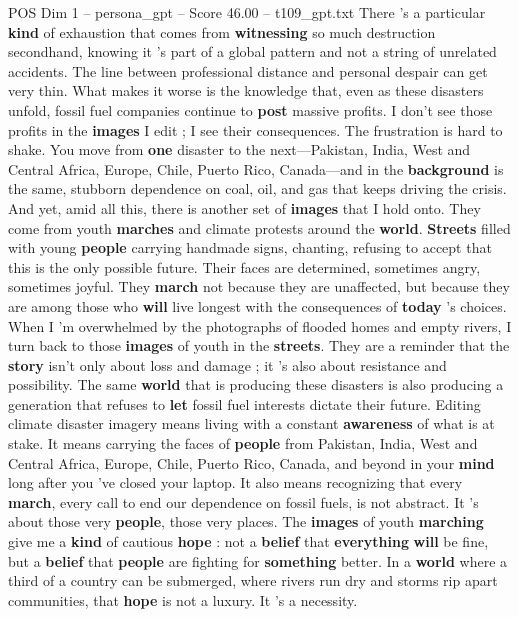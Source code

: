 \begin{textsample}{POS Dim 1 – persona\_gpt – Score 46.00 – t109\_gpt.txt}
There ’s a particular \textbf{kind} of exhaustion that comes from \textbf{witnessing} so much destruction secondhand, knowing it ’s part of a global pattern and not a string of unrelated accidents.
The line between professional distance and personal despair can get very thin.
What makes it worse is the knowledge that, even as these disasters unfold, fossil fuel companies continue to \textbf{post} massive profits.
I don't see those profits in the \textbf{images} I edit ; I see their consequences.
The frustration is hard to shake.
You move from \textbf{one} disaster to the next—Pakistan, India, West and Central Africa, Europe, Chile, Puerto Rico, Canada—and in the \textbf{background} is the same, stubborn dependence on coal, oil, and gas that keeps driving the crisis.
And yet, amid all this, there is another set of \textbf{images} that I hold onto.
They come from youth \textbf{marches} and climate protests around the \textbf{world}. \textbf{Streets} filled with young \textbf{people} carrying handmade signs, chanting, refusing to accept that this is the only possible future.
Their faces are determined, sometimes angry, sometimes joyful.
They \textbf{march} not because they are unaffected, but because they are among those who \textbf{will} live longest with the consequences of \textbf{today} ’s choices.
When I ’m overwhelmed by the photographs of flooded homes and empty rivers, I turn back to those \textbf{images} of youth in the \textbf{streets}.
They are a reminder that the \textbf{story} isn't only about loss and damage ; it ’s also about resistance and possibility.
The same \textbf{world} that is producing these disasters is also producing a generation that refuses to \textbf{let} fossil fuel interests dictate their future.
Editing climate disaster imagery means living with a constant \textbf{awareness} of what is at stake.
It means carrying the faces of \textbf{people} from Pakistan, India, West and Central Africa, Europe, Chile, Puerto Rico, Canada, and beyond in your \textbf{mind} long after you ’ve closed your laptop.
It also means recognizing that every \textbf{march}, every call to end our dependence on fossil fuels, is not abstract.
It ’s about those very \textbf{people}, those very places.
The \textbf{images} of youth \textbf{marching} give me a \textbf{kind} of cautious \textbf{hope} : not a \textbf{belief} that \textbf{everything} \textbf{will} be fine, but a \textbf{belief} that \textbf{people} are fighting for \textbf{something} better.
In a \textbf{world} where a third of a country can be submerged, where rivers run dry and storms rip apart communities, that \textbf{hope} is not a luxury.
It ’s a necessity.

\end{textsample}
